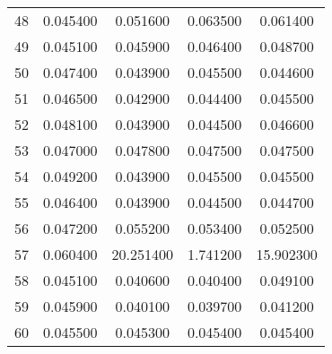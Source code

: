 \begin{longtable}{c|c|ccc}
48  &   0.045400  &   0.051600  &   0.063500   &   0.061400  \\
49  &   0.045100  &   0.045900  &   0.046400   &   0.048700  \\
50  &   0.047400  &   0.043900  &   0.045500   &   0.044600  \\
51  &   0.046500  &   0.042900  &   0.044400   &   0.045500  \\
52  &   0.048100  &   0.043900  &   0.044500   &   0.046600  \\
53  &   0.047000  &   0.047800  &   0.047500   &   0.047500  \\
54  &   0.049200  &   0.043900  &   0.045500   &   0.045500  \\
55  &   0.046400  &   0.043900  &   0.044500   &   0.044700  \\
56  &   0.047200  &   0.055200  &   0.053400   &   0.052500  \\
57  &   0.060400  &  20.251400  &   1.741200   &  15.902300  \\
58  &   0.045100  &   0.040600  &   0.040400   &   0.049100  \\
59  &   0.045900  &   0.040100  &   0.039700   &   0.041200  \\
60  &   0.045500  &   0.045300  &   0.045400   &   0.045400  \\

 \hline
\end{longtable}
